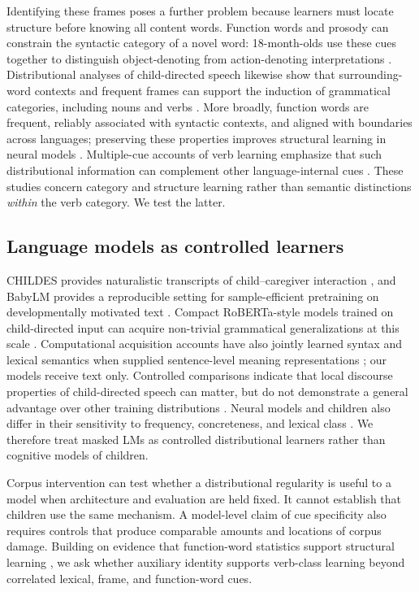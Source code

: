 \documentclass[11pt]{article}
\begin{document}
Identifying these frames poses a further problem because learners must locate structure before knowing all content words. Function words and prosody can constrain the syntactic category of a novel word: 18-month-olds use these cues together to distinguish object-denoting from action-denoting interpretations \citep{decarvalho2019}. Distributional analyses of child-directed speech likewise show that surrounding-word contexts and frequent frames can support the induction of grammatical categories, including nouns and verbs \citep{mintz2002,mintz2003}. More broadly, function words are frequent, reliably associated with syntactic contexts, and aligned with boundaries across languages; preserving these properties improves structural learning in neural models \citep{yang2026}. Multiple-cue accounts of verb learning emphasize that such distributional information can complement other language-internal cues \citep{christiansenmonaghan2006}. These studies concern category and structure learning rather than semantic distinctions \emph{within} the verb category. We test the latter.

\subsection{Language models as controlled learners}

CHILDES provides naturalistic transcripts of child--caregiver interaction \citep{macwhinney2000}, and BabyLM provides a reproducible setting for sample-efficient pretraining on developmentally motivated text \citep{warstadt2023}. Compact RoBERTa-style models trained on child-directed input can acquire non-trivial grammatical generalizations at this scale \citep{huebner2021}. Computational acquisition accounts have also jointly learned syntax and lexical semantics when supplied sentence-level meaning representations \citep{abend2017}; our models receive text only. Controlled comparisons indicate that local discourse properties of child-directed speech can matter, but do not demonstrate a general advantage over other training distributions \citep{feng2024}. Neural models and children also differ in their sensitivity to frequency, concreteness, and lexical class \citep{chang2022}. We therefore treat masked LMs as controlled distributional learners rather than cognitive models of children.

Corpus intervention can test whether a distributional regularity is useful to a model when architecture and evaluation are held fixed. It cannot establish that children use the same mechanism. A model-level claim of cue specificity also requires controls that produce comparable amounts and locations of corpus damage. Building on evidence that function-word statistics support structural learning \citep{yang2026}, we ask whether auxiliary identity supports verb-class learning beyond correlated lexical, frame, and function-word cues.
\end{document}
